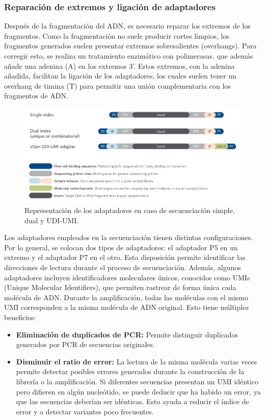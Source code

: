 \subsubsection{Reparación de extremos y ligación de adaptadores}
Después de la fragmentación del ADN, es necesario reparar los extremos de los fragmentos. Como la fragmentación no suele producir cortes limpios, los fragmentos generados suelen presentar extremos sobresalientes (overhangs). Para corregir esto, se realiza un tratamiento enzimático con polimerasas, que además añade una adenina (A) en los extremos 3’. Estos extremos, con la adenina añadida, facilitan la ligación de los adaptadores, los cuales suelen tener un overhang de timina (T) para permitir una unión complementaria con los fragmentos de ADN.

\begin{figure}[htbp]
\centering
\includegraphics[width = \textwidth]{figs/adaptator.png}
\caption{Representación de los adaptadores en caso de secuenciación simple, dual y UDI-UMI.}
\end{figure}

Los adaptadores empleados en la secuenciación tienen distintas configuraciones. Por lo general, se colocan dos tipos de adaptadores: el adaptador P5 en un extremo y el adaptador P7 en el otro. Esta disposición permite identificar las direcciones de lectura durante el proceso de secuenciación. Además, algunos adaptadores incluyen identificadores moleculares únicos, conocidos como UMIs (Unique Molecular Identifiers), que permiten rastrear de forma única cada molécula de ADN. Durante la amplificación, todas las moléculas con el mismo UMI corresponden a la misma molécula de ADN original. Esto tiene múltiples beneficios:
\begin{itemize}
\item \textbf{Eliminación de duplicados de PCR:} Permite distinguir duplicados generados por PCR de secuencias originales.
\item \textbf{Disminuir el ratio de error:} La lectura de la misma molécula varias veces permite detectar posibles errores generados durante la construcción de la librería o la amplificación. Si diferentes secuencias presentan un UMI idéntico pero difieren en algún nucleótido, se puede deducir que ha habido un error, ya que las secuencias deberían ser idénticas. Esto ayuda a reducir el índice de error y a detectar variantes poco frecuentes.
\end{itemize}

